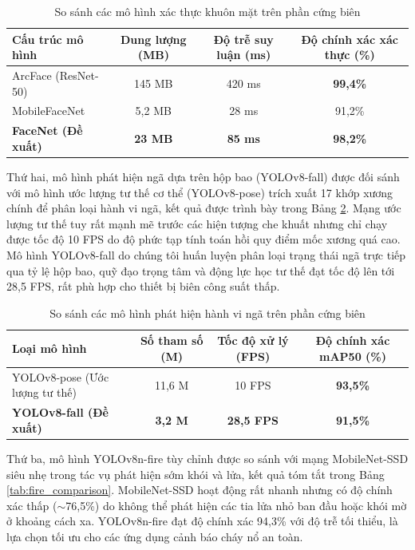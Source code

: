 \documentclass[12pt,a4paper]{article}
\begin{document}
\begin{table}[h]
    \centering
    \caption{So sánh các mô hình xác thực khuôn mặt trên phần cứng biên}
    \label{tab:face_comparison}
    \begin{tabular}{lccc}
        \toprule
        \textbf{Cấu trúc mô hình} & \textbf{Dung lượng (MB)} & \textbf{Độ trễ suy luận (ms)} & \textbf{Độ chính xác xác thực (\%)} \\
        \midrule
        ArcFace (ResNet-50) & 145 MB & 420 ms & \textbf{99,4\%} \\
        MobileFaceNet & 5,2 MB & 28 ms & 91,2\% \\
        \textbf{FaceNet (Đề xuất)} & \textbf{23 MB} & \textbf{85 ms} & \textbf{98,2\%} \\
        \bottomrule
    \end{tabular}
\end{table}

Thứ hai, mô hình phát hiện ngã dựa trên hộp bao (YOLOv8-fall) được đối sánh với mô hình ước lượng tư thế cơ thể (YOLOv8-pose) trích xuất 17 khớp xương chính để phân loại hành vi ngã, kết quả được trình bày trong Bảng \ref{tab:fall_comparison}.
Mạng ước lượng tư thế tuy rất mạnh mẽ trước các hiện tượng che khuất nhưng chỉ chạy được tốc độ 10 FPS do độ phức tạp tính toán hồi quy điểm mốc xương quá cao. Mô hình YOLOv8-fall do chúng tôi huấn luyện phân loại trạng thái ngã trực tiếp qua tỷ lệ hộp bao, quỹ đạo trọng tâm và động lực học tư thế đạt tốc độ lên tới 28,5 FPS, rất phù hợp cho thiết bị biên công suất thấp.

\begin{table}[h]
    \centering
    \caption{So sánh các mô hình phát hiện hành vi ngã trên phần cứng biên}
    \label{tab:fall_comparison}
    \begin{tabular}{lccc}
        \toprule
        \textbf{Loại mô hình} & \textbf{Số tham số (M)} & \textbf{Tốc độ xử lý (FPS)} & \textbf{Độ chính xác mAP50 (\%)} \\
        \midrule
        YOLOv8-pose (Ước lượng tư thế) & 11,6 M & 10 FPS & \textbf{93,5\%} \\
        \textbf{YOLOv8-fall (Đề xuất)} & \textbf{3,2 M} & \textbf{28,5 FPS} & \textbf{91,5\%} \\
        \bottomrule
    \end{tabular}
\end{table}

Thứ ba, mô hình YOLOv8n-fire tùy chỉnh được so sánh với mạng MobileNet-SSD siêu nhẹ trong tác vụ phát hiện sớm khói và lửa, kết quả tóm tắt trong Bảng \ref{tab:fire_comparison}.
MobileNet-SSD hoạt động rất nhanh nhưng có độ chính xác thấp ($\sim$76,5\%) do không thể phát hiện các tia lửa nhỏ ban đầu hoặc khói mờ ở khoảng cách xa. YOLOv8n-fire đạt độ chính xác 94,3\% với độ trễ tối thiểu, là lựa chọn tối ưu cho các ứng dụng cảnh báo cháy nổ an toàn.
\end{document}
